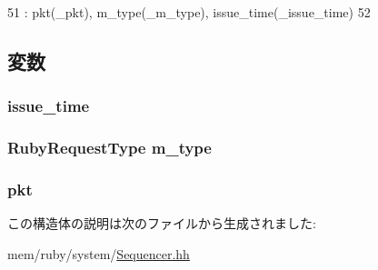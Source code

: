 \begin{DoxyCode}
51         : pkt(_pkt), m_type(_m_type), issue_time(_issue_time)
52     {}
\end{DoxyCode}


\subsection{変数}
\hypertarget{structSequencerRequest_aa9c7c90a6f11931d8a6f2f9736929679}{
\subsubsection[{issue\_\-time}]{ {\bf issue\_\-time}}}
\label{structSequencerRequest_aa9c7c90a6f11931d8a6f2f9736929679}
\hypertarget{structSequencerRequest_a7d010f0854d320898448eae2da5997f8}{
\subsubsection[{m\_\-type}]{\setlength{\rightskip}{0pt plus 5cm}RubyRequestType {\bf m\_\-type}}}
\label{structSequencerRequest_a7d010f0854d320898448eae2da5997f8}
\hypertarget{structSequencerRequest_a3a891bc2a0fcbe6be5297077d94e2df7}{
\subsubsection[{pkt}]{ {\bf pkt}}}
\label{structSequencerRequest_a3a891bc2a0fcbe6be5297077d94e2df7}


この構造体の説明は次のファイルから生成されました:\begin{DoxyCompactItemize}
\item 
mem/ruby/system/\hyperlink{Sequencer_8hh}{Sequencer.hh}\end{DoxyCompactItemize}
